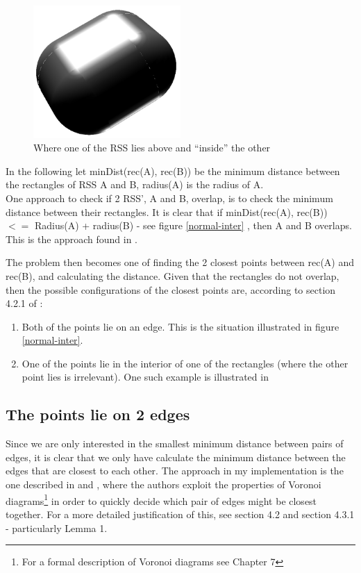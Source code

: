 \begin{figure}
\centering
\includegraphics[width=0.5\textwidth]{figures/sepAxis}
\caption{\label{sep-Axis}Where one of the RSS lies above and ``inside'' the other}
\end{figure}

In the following let minDist(rec(A), rec(B)) be the minimum distance between the rectangles of RSS A and B, radius(A) is the radius of A.\\

One approach to check if 2 RSS', A and B, overlap, is to check the minimum distance between their rectangles. It is clear that if minDist(rec(A), rec(B)) $<=$ Radius(A) + radius(B) - see figure \ref{normal-inter} , then A and B overlaps. This is the approach found in \cite{Larsen99fastproximity}.

The problem then becomes one of finding the 2 closest points between rec(A) and rec(B), and calculating the distance.
Given that the rectangles do not overlap, then the possible configurations of the closest points are, according to section 4.2.1 of \cite{Larsen99fastproximity}:
\begin{enumerate}
\item Both of the points lie on an edge. This is the situation illustrated in figure \ref{normal-inter}.
\item One of the points lie in the interior of one of the rectangles (where the other point lies is irrelevant). One such example is illustrated in 
\end{enumerate}

\subsection{The points lie on 2 edges}
\label{minimumDistance}
Since we are only interested in the smallest minimum distance between pairs of edges, it is clear that we only have calculate the minimum distance between the edges that are closest to each other. The approach in my implementation is the one described in \cite{larsen00fast} and \cite{Larsen99fastproximity}, where the authors exploit the properties of Voronoi diagrams\footnote{For a formal description of Voronoi diagrams see \cite{compgeom:2008} Chapter 7} in order to quickly decide which pair of edges might be closest together. For a more detailed justification of this, see \cite{larsen00fast} section 4.2 and \cite{Larsen99fastproximity} section 4.3.1 - particularly Lemma 1. 

